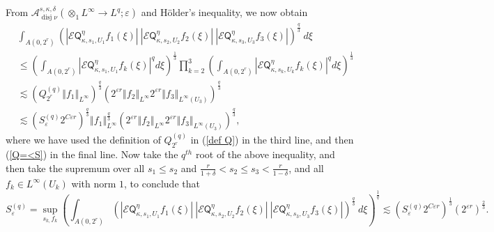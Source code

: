 \documentclass{amsart}%
\theoremstyle{plain}
\numberwithin{equation}{section}
\begin{document}
From $\mathcal{A}_{\operatorname*{disj}\nu}^{s,\kappa,\delta}\left(
\otimes_{1}L^{\infty}\rightarrow L^{q};\varepsilon\right)  $ and H\"{o}lder's
inequality, we now obtain
\begin{align*}
&  \int_{A\left(  0,2^{r}\right)  }\left(  \left\vert \mathcal{E}%
\mathsf{Q}_{\kappa,s_{1},U_{1}}^{\eta}f_{1}\left(  \xi\right)  \right\vert
\ \left\vert \mathcal{E}\mathsf{Q}_{\kappa,s_{2},U_{2}}^{\eta}f_{2}\left(
\xi\right)  \right\vert \ \left\vert \mathcal{E}\mathsf{Q}_{\kappa,s_{3}%
,U_{3}}^{\eta}f_{3}\left(  \xi\right)  \right\vert \right)  ^{\frac{q}{3}%
}\ d\xi\\
&  \leq\left(  \int_{A\left(  0,2^{r}\right)  }\left\vert \mathcal{E}%
\mathsf{Q}_{\kappa,s_{1},U_{1}}^{\eta}f_{k}\left(  \xi\right)  \right\vert
^{q}d\xi\right)  ^{\frac{1}{3}}\prod_{k=2}^{3}\left(  \int_{A\left(
0,2^{r}\right)  }\left\vert \mathcal{E}\mathsf{Q}_{\kappa,s_{k},U_{k}}^{\eta
}f_{k}\left(  \xi\right)  \right\vert ^{q}d\xi\right)  ^{\frac{1}{3}}\\
&  \lesssim\left(  Q_{2^{r}}^{\left(  q\right)  }\left\Vert f_{1}\right\Vert
_{L^{\infty}}\right)  ^{\frac{q}{3}}\left(  2^{\varepsilon r}\left\Vert
f_{2}\right\Vert _{L^{\infty}}2^{\varepsilon r}\left\Vert f_{3}\right\Vert
_{L^{\infty}\left(  U_{3}\right)  }\right)  ^{\frac{q}{3}}\\
&  \lesssim\left(  S_{\varepsilon}^{\left(  q\right)  }2^{C\varepsilon
r}\right)  ^{\frac{q}{3}}\left\Vert f_{1}\right\Vert _{L^{\infty}}^{\frac
{q}{3}}\left(  2^{\varepsilon r}\left\Vert f_{2}\right\Vert _{L^{\infty}%
}2^{\varepsilon r}\left\Vert f_{3}\right\Vert _{L^{\infty}\left(
U_{3}\right)  }\right)  ^{\frac{q}{3}},
\end{align*}
where we have used the definition of $Q_{2^{r}}^{\left(  q\right)  }$ in
(\ref{def Q}) in the third line, and then (\ref{Q=<S}) in the final line. Now
take the $q^{th}$ root of the above inequality, and then take the supremum
over all $s_{1}\leq s_{2}$ and $\frac{r}{1+\delta}<s_{2}\leq s_{3}<\frac
{r}{1-\delta}$, and all $f_{k}\in L^{\infty}\left(  U_{k}\right)  $ with norm
$1$, to conclude that%
\[
S_{\varepsilon}^{\left(  q\right)  }=\sup_{s_{k,}f_{k}}\left(  \int_{A\left(
0,2^{r}\right)  }\left(  \left\vert \mathcal{E}\mathsf{Q}_{\kappa,s_{1},U_{1}%
}^{\eta}f_{1}\left(  \xi\right)  \right\vert \ \left\vert \mathcal{E}%
\mathsf{Q}_{\kappa,s_{2},U_{2}}^{\eta}f_{2}\left(  \xi\right)  \right\vert
\ \left\vert \mathcal{E}\mathsf{Q}_{\kappa,s_{3},U_{3}}^{\eta}f_{3}\left(
\xi\right)  \right\vert \right)  ^{\frac{q}{3}}\ d\xi\right)  ^{\frac{1}{q}%
}\lesssim\left(  S_{\varepsilon}^{\left(  q\right)  }2^{C\varepsilon
r}\right)  ^{\frac{1}{3}}\left(  2^{\varepsilon r}\right)  ^{\frac{2}{3}}.
\]
\end{document}
